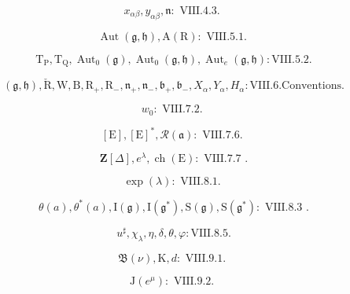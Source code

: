 \[
x _ {\alpha \beta}, y _ {\alpha \beta}, \mathfrak {n}: \text {   VIII.4.3.   }
\]

\[
\operatorname{Aut} (\mathfrak {g}, \mathfrak {h}), \mathrm{A} (\mathrm{R}): \text {   VIII.5.1.   }
\]

\[
\mathrm{T} _ {\mathrm{P}}, \mathrm{T} _ {\mathrm{Q}}, \operatorname{Aut} _ {0} (\mathfrak {g}), \operatorname{Aut} _ {0} (\mathfrak {g}, \mathfrak {h}), \operatorname{Aut} _ {e} (\mathfrak {g}, \mathfrak {h}): \text {VIII.5.2}.
\]

\[
(\mathfrak {g}, \mathfrak {h}), \check {\mathrm{R}}, \mathrm{W}, \mathrm{B}, \mathrm{R} _ {+}, \mathrm{R} _ {-}, \mathfrak {n} _ {+}, \mathfrak {n} _ {-}, \mathfrak {b} _ {+}, \mathfrak {b} _ {-}, X _ {\alpha}, Y _ {\alpha}, H _ {\alpha}: \text {VIII.6.Conventions.}
\]

\[
w _ {0} \colon \text {   VIII.7.2.   }
\]

\[
[ \mathrm{E} ], [ \mathrm{E} ] ^ {*}, \mathscr {R} (\mathfrak {a}): \text {   VIII.7.6.   }
\]

\[
\mathbf {Z} [ \Delta ], e ^ {\lambda}, \operatorname{ch} (\mathrm{E}) \colon \text { VIII.7.7 }.
\]

\[
\exp (\lambda): \text {   VIII.8.1.   }
\]

\[
\theta (a), \theta^ {*} (a), \mathrm{I} (\mathfrak {g}), \mathrm{I} (\mathfrak {g} ^ {*}), \mathrm{S} (\mathfrak {g}), \mathrm{S} (\mathfrak {g} ^ {*}) \colon \text { VIII.8.3 }.
\]

\[
u ^ {\sharp}, \chi_ {\lambda}, \eta , \delta , \theta , \varphi : \mathrm{VIII.8.5}.
\]

\[
\mathfrak {B} (\nu), \mathrm{K}, d: \text {   VIII.9.1.   }
\]

\[
\mathrm{J} (e ^ {\mu}) \colon \text { VIII.9.2. }
\]

